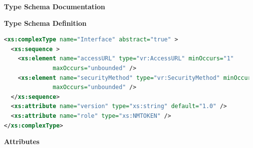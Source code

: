 \documentclass[11pt,a4paper]{ivoa}
\begin{document}
\begingroup
      	\renewcommand*\descriptionlabel[1]{%
      	\hbox to 5.5em{\emph{#1}\hfil}}\vspace{2ex}\noindent\textbf{ Type Schema Documentation}




\vspace{1ex}\noindent\textbf{ Type Schema Definition}

\begin{lstlisting}[language=XML,basicstyle=\footnotesize]
<xs:complexType name="Interface" abstract="true" >
  <xs:sequence >
    <xs:element name="accessURL" type="vr:AccessURL" minOccurs="1"
              maxOccurs="unbounded" />
    <xs:element name="securityMethod" type="vr:SecurityMethod" minOccurs="0"
              maxOccurs="unbounded" />
  </xs:sequence>
  <xs:attribute name="version" type="xs:string" default="1.0" />
  <xs:attribute name="role" type="xs:NMTOKEN" />
</xs:complexType>
\end{lstlisting}

\vspace{0.5ex}\noindent\textbf{ Attributes}
\end{document}
